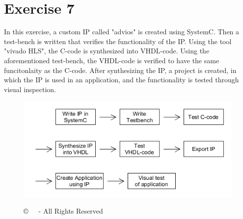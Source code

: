 
\chapter{Exercise 7}

In this exercise, a custom IP called "advios" is created using SystemC. Then a test-bench is written that verifies the functionality of the IP. Using the tool "vivado HLS", the C-code is synthesized into VHDL-code. Using the aforementioned test-bench, the VHDL-code is verified to have the same funcitonlaity as the C-code.
After synthesizing the IP, a project is created, in which the IP is used in an application, and the functionality is tested through visual inspection.

\begin{figure}[b]
	\centering
	{\includegraphics[scale=0.5]{Images/2_7_procedure.png}}\\[0.5cm]
	\large \date\\[0.5cm]
	\copyright \sffamily  \ \ \the\year \ - All Rights Reserved
\end{figure}